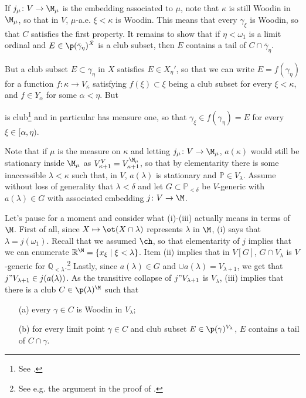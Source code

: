 {{		\qquad If $j_\mu\colon V\to\M_\mu$ is the embedding associated to $\mu$, note that $\kappa$ is still Woodin in $\M_\mu$, so that in $V$, $\mu$-a.e. $\xi<\kappa$ is Woodin. This means that every $\gamma_\xi$ is Woodin, so that $C$ satisfies the first property. It remains to show that if $\eta<\omega_1$ is a limit ordinal and $E\in\p(\bar\gamma_\eta)^{\bar X}$ is a club subset, then $E$ contains a tail of $C\cap\bar\gamma_\eta$.

		\qquad But a club subset $E\subset\gamma_\eta$ in $X$ satisfies $E\in X_\eta'$, so that we can write $E=f(\gamma_\eta)$ for a function $f\colon \kappa\to V_\kappa$ satisfying $f(\xi)\subset\xi$ being a club subset for every $\xi<\kappa$, and $f\in Y_\alpha$ for some $\alpha<\eta$. But

		is club\footnote{See \cite[Exercise 1.1.14]{Larson}.} and in particular has measure one, so that $\gamma_\xi\in f(\gamma_\eta)=E$ for every $\xi\in[\alpha,\eta)$.
	}
	
	Note that if $\mu$ is the measure on $\kappa$ and letting $j_\mu\colon V\to\M_\mu$, $a(\kappa)$ would still be stationary inside $\M_\mu$ as $V_{\kappa+1}^V=V_{\kappa+1}^{\M_\mu}$, so that by elementarity there is some inaccessible $\lambda<\kappa$ such that, in $V$, $a(\lambda)$ is stationary and $\mathbb P\in V_\lambda$. Assume without loss of generality that $\lambda<\delta$ and let $G\subset\mathbb P_{<\delta}$ be $V$-generic with $a(\lambda)\in G$ with associated embedding $j\colon V\to\M$.

	\qquad Let's pause for a moment and consider what (i)-(iii) actually means in terms of $\M$. First of all, since $X\mapsto\ot(X\cap\lambda)$ represents $\lambda$ in $\M$, (i) says that $\lambda=j(\omega_1)$. Recall that we assumed $\ch$, so that elementarity of $j$ implies that we can enumerate $\mathbb R^{\M}=\{x_\xi\mid\xi<\lambda\}$. Item (ii) implies that in $V[G]$, $G\cap V_\lambda$ is $V$-generic for $\mathbb Q_{<\lambda}$.\footnote{See e.g. the argument in the proof of \cite[Lemma 2.7.14]{Larson}.} Lastly, since $a(\lambda)\in G$ and $\cup a(\lambda)=V_{\lambda+1}$, we get that $j"V_{\lambda+1}\in j(a(\lambda))$. As the transitive collapse of $j"V_{\lambda+1}$ is $V_\lambda$, (iii) implies that there is a club $C\in\p(\lambda)^{\M}$ such that
	\begin{itemize}
		\item[(a)] every $\gamma\in C$ is Woodin in $V_\lambda$;
		\item[(b)] for every limit point $\gamma\in C$ and club subset $E\in\p(\gamma)^{V_\lambda}$, $E$ contains a tail of $C\cap\gamma$.\\
	\end{itemize}

}
